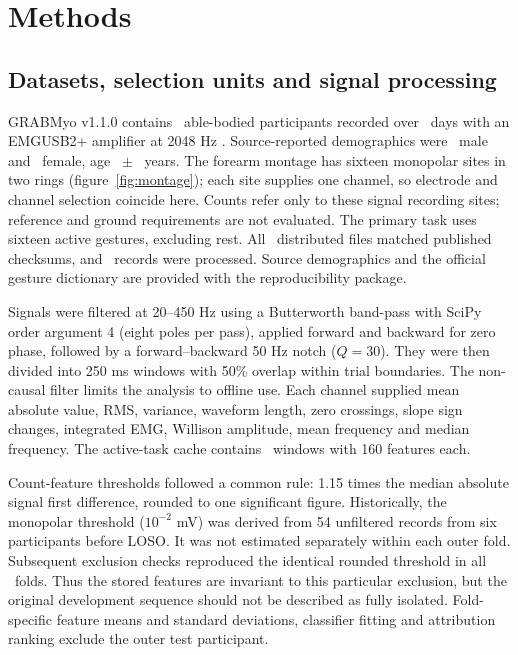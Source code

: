 \section{Methods}
\subsection{Datasets, selection units and signal processing}
GRABMyo v1.1.0 contains \GRABMyoParticipants\ able-bodied participants recorded over \GRABMyoSessions\ days with an EMGUSB2+ amplifier at 2048 Hz \citep{pradhan2022multiday,jiang2024grabmyo}. Source-reported demographics were \GRABMyoMale\ male and \GRABMyoFemale\ female, age \GRABMyoAgeMean\ $\pm$ \GRABMyoAgeSD\ years. The forearm montage has sixteen monopolar sites in two rings (figure~\ref{fig:montage}); each site supplies one channel, so electrode and channel selection coincide here. Counts refer only to these signal recording sites; reference and ground requirements are not evaluated. The primary task uses sixteen active gestures, excluding rest. All \GRABMyoFilesVerified\ distributed files matched published checksums, and \GRABMyoRecords\ records were processed. Source demographics and the official gesture dictionary are provided with the reproducibility package.

Signals were filtered at 20--450 Hz using a Butterworth band-pass with SciPy order argument 4 (eight poles per pass), applied forward and backward for zero phase, followed by a forward--backward 50 Hz notch ($Q=30$). They were then divided into 250 ms windows with 50\% overlap within trial boundaries. The non-causal filter limits the analysis to offline use. Each channel supplied mean absolute value, RMS, variance, waveform length, zero crossings, slope sign changes, integrated EMG, Willison amplitude, mean frequency and median frequency. The active-task cache contains \GRABMyoActiveWindows\ windows with 160 features each.

Count-feature thresholds followed a common rule: 1.15 times the median absolute signal first difference, rounded to one significant figure. Historically, the monopolar threshold ($10^{-2}$ mV) was derived from 54 unfiltered records from six participants before LOSO. It was not estimated separately within each outer fold. Subsequent exclusion checks reproduced the identical rounded threshold in all \LOOMonoFolds\ folds. Thus the stored features are invariant to this particular exclusion, but the original development sequence should not be described as fully isolated. Fold-specific feature means and standard deviations, classifier fitting and attribution ranking exclude the outer test participant.

